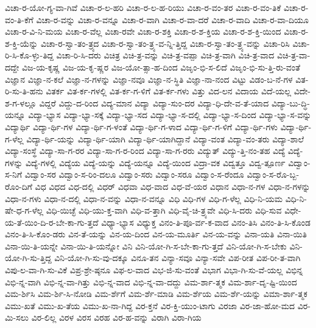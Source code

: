{ವಿಚಾ-ರ-ಯೋ-ಗ್ಯ-ವಾ-ಗಿವೆ
ವಿಚಾ-ರ-ಲ-ಹರಿ
ವಿಚಾ-ರ-ಲ-ಹ-ರಿಯು
ವಿಚಾ-ರ-ವಂ-ತರ
ವಿಚಾ-ರ-ವಂ-ತಿಕೆ
ವಿಚಾ-ರ-ವಂ-ತಿ-ಕೆಗೆ
ವಿಚಾ-ರ-ವನ್ನು
ವಿಚಾ-ರ-ವನ್ನೂ
ವಿಚಾ-ರ-ವಾಗಿ
ವಿಚಾ-ರ-ವಾ-ದರೆ
ವಿಚಾ-ರ-ವಾದಿ
ವಿಚಾ-ರ-ವಾ-ದಿಯೂ
ವಿಚಾ-ರ-ವಿ-ನಿ-ಮಯ
ವಿಚಾ-ರ-ವೆಲ್ಲ
ವಿಚಾ-ರವೇ
ವಿಚಾ-ರ-ಶಕ್ತಿ
ವಿಚಾ-ರ-ಶ-ಕ್ತಿಯ
ವಿಚಾ-ರ-ಶ-ಕ್ತಿ-ಯಿಂದ
ವಿಚಾ-ರ-ಶ-ಕ್ತಿ-ಯೆನ್ನು
ವಿಚಾ-ರ-ಸ್ವಾ-ತಂ-ತ್ರ್ಯದ
ವಿಚಾ-ರ-ಸ್ವಾ-ತಂ-ತ್ರ್ಯ-ವ-ನ್ನಿ-ತ್ತಿದ್ದ
ವಿಚಾ-ರ-ಸ್ವಾ-ತಂ-ತ್ರ್ಯ-ವನ್ನು
ವಿಚಾ-ರಿಸಿ
ವಿಚಾ-ರಿ-ಸಿ-ಕೊ-ಳ್ಳು-ತಿದ್ದ
ವಿಚಾ-ರಿ-ಸಿ-ದರು
ವಿಚಿತ್ರ
ವಿಚಿ-ತ್ರ-ವನ್ನು
ವಿಚಿ-ತ್ರ-ವಪ್ಪಾ
ವಿಚಿ-ತ್ರ-ವಾಗಿ
ವಿಚಿ-ತ್ರ-ವಾದ
ವಿಚಿ-ತ್ರ-ವಾ-ದದ್ದೇ
ವಿಜ-ಯ-ಕೃಷ್ಣ
ವಿಜ-ಯ-ಕೃ-ಷ್ಣರ
ವಿಜ-ಯೋ-ತ್ಸಾ-ಹ-ದಿಂದ
ವಿಜೃಂ-ಭಿ-ಸ-ಲಿದೆ
ವಿಜೃಂ-ಭಿ-ಸು-ತ್ತಿ-ರು-ವಂತೆ
ವಿಜ್ಞಾನ
ವಿಜ್ಞಾ-ನ-ಕಲೆ
ವಿಜ್ಞಾ-ನ-ಗಳನ್ನು
ವಿಜ್ಞಾ-ನವೂ
ವಿಜ್ಞಾ-ನ-ಸ್ಥಿತಿ
ವಿಜ್ಞಾ-ನಾ-ನಂದ
ವಿಟ್ಟು
ವಿಡಂ-ಬ-ನೆ-ಗಳ
ವಿತ-ರಿ-ಸು-ತಿ-ಹನು
ವಿತರ್ಕ
ವಿತ-ರ್ಕ-ಗಳಲ್ಲಿ
ವಿತ-ರ್ಕ-ಗ-ಳಿಗೆ
ವಿತ-ರ್ಕ-ಗಳು
ವಿತ್ತು
ವಿದ-ಲನ
ವಿದಾಯ
ವಿದೆ-ಯಲ್ಲ
ವಿದೇ-ಶ-ಗ-ಳಲ್ಲೂ
ವಿದ್ದರೆ
ವಿದ್ದು-ದ-ರಿಂದ
ವಿದ್ಯ-ಮಾನ
ವಿದ್ಯಾ
ವಿದ್ಯಾ-ಸುಂ-ದರ
ವಿದ್ಯಾ-ಧಿ-ದೇ-ವ-ತೆ-ಯಾದ
ವಿದ್ಯಾ-ಬು-ದ್ಧಿ-ಯನ್ನೂ
ವಿದ್ಯಾ-ಭ್ಯಾಸ
ವಿದ್ಯಾ-ಭ್ಯಾ-ಸಕ್ಕೆ
ವಿದ್ಯಾ-ಭ್ಯಾ-ಸದ
ವಿದ್ಯಾ-ಭ್ಯಾ-ಸ-ದಲ್ಲಿ
ವಿದ್ಯಾ-ಭ್ಯಾ-ಸ-ದಿಂದ
ವಿದ್ಯಾ-ಭ್ಯಾ-ಸ-ವನ್ನು
ವಿದ್ಯಾರ್ಥಿ
ವಿದ್ಯಾ-ರ್ಥಿ-ಗಳ
ವಿದ್ಯಾ-ರ್ಥಿ-ಗ-ಳಂತೆ
ವಿದ್ಯಾ-ರ್ಥಿ-ಗ-ಳಾದ
ವಿದ್ಯಾ-ರ್ಥಿ-ಗ-ಳಿಗೆ
ವಿದ್ಯಾ-ರ್ಥಿ-ಗಳು
ವಿದ್ಯಾ-ರ್ಥಿ-ಗ-ಳೆಲ್ಲ
ವಿದ್ಯಾ-ರ್ಥಿ-ಯನ್ನು
ವಿದ್ಯಾ-ರ್ಥಿ-ಯಾಗಿ
ವಿದ್ಯಾ-ರ್ಥಿ-ಯಾಗಿದ್ದಾನೆ
ವಿದ್ಯಾ-ವಂತ
ವಿದ್ಯಾ-ವಂ-ತರು
ವಿದ್ಯಾ-ಶಾಲೆ
ವಿದ್ಯಾ-ಸಂಸ್ಥೆ
ವಿದ್ಯಾ-ಸಾ-ಗ-ರರ
ವಿದ್ಯಾ-ಸಾ-ಗ-ರ-ರಿಂದ
ವಿದ್ಯಾ-ಸಾ-ಗ-ರರು
ವಿದ್ಯುತ್
ವಿದ್ಯು-ತ್ತಿ-ನಂ-ತಹ
ವಿದ್ಯೆ
ವಿದ್ಯೆ-ಗಳನ್ನು
ವಿದ್ಯೆ-ಗಳಲ್ಲಿ
ವಿದ್ಯೆಯ
ವಿದ್ಯೆ-ಯನ್ನು
ವಿದ್ಯೆ-ಯನ್ನೂ
ವಿದ್ಯೆ-ಯಿಂದ
ವಿದ್ರಾ-ವಕ
ವಿದ್ವತ್ತೂ
ವಿದ್ವ-ತ್ಪೂರ್ಣ
ವಿದ್ವಾಂ-ಸ-ನಿಗೆ
ವಿದ್ವಾಂ-ಸರ
ವಿದ್ವಾಂ-ಸ-ರಿಂ-ದಲೂ
ವಿದ್ವಾಂ-ಸರು
ವಿದ್ವಾಂ-ಸರೂ
ವಿದ್ವಾಂ-ಸ-ರೆಂದೂ
ವಿದ್ವಾಂ-ಸ-ರೊ-ಬ್ಬ-ರೊಂ-ದಿಗೆ
ವಿಧ
ವಿಧದ
ವಿಧ-ದಲ್ಲಿ
ವಿಧರ್
ವಿಧವಾ
ವಿಧ-ವಾದ
ವಿಧ-ವೆ-ಯರ
ವಿಧಾನ
ವಿಧಾ-ನ-ಗಳ
ವಿಧಾ-ನ-ಗಳನ್ನು
ವಿಧಾ-ನ-ಗಳು
ವಿಧಾ-ನ-ದಲ್ಲಿ
ವಿಧಾ-ನ-ವನ್ನು
ವಿಧಾ-ನ-ವನ್ನೂ
ವಿಧಿ
ವಿಧಿ-ಗಳ
ವಿಧಿ-ಗ-ಳೆಲ್ಲ
ವಿಧಿ-ನಿ-ಯಮ
ವಿಧಿ-ನಿ-ಷೇ-ಧ-ಗ-ಳೆಲ್ಲ
ವಿಧಿ-ಯಿಚ್ಛೆ
ವಿಧಿ-ಯು-ಕ್ತ-ವಾಗಿ
ವಿಧಿ-ವ-ತ್ತಾಗಿ
ವಿಧಿ-ವೈ-ಚಿ-ತ್ರ್ಯವೇ
ವಿಧಿ-ಸಿ-ದರು
ವಿಧಿ-ಸುವ
ವಿಧೇ-ಯ-ತೆ-ಯಿಂ-ದಿ-ರ-ಬೇ-ಕಾ-ಗು-ತ್ತದೆ
ವಿಧ್ಯಾ-ಭ್ಯಾಸ
ವಿಧ್ಯುಕ್ತ
ವಿನಂ-ತಿ-ಪೂ-ರ್ವ-ಕ-ವಾದ
ವಿನಂ-ತಿಸಿ
ವಿನಂ-ತಿ-ಸಿ-ಕೊಂಡ
ವಿನಂ-ತಿ-ಸಿ-ಕೊಂ-ಡರು
ವಿನ-ತೆ-ಯನ್ನು
ವಿನ-ಯ-ದಿಂದ
ವಿನ-ಯ-ಮೂರ್ತಿ
ವಿನ-ಯ-ವನ್ನು
ವಿನಾ-ಯತಿ
ವಿನಾ-ಯಿತಿ
ವಿನಾ-ಯಿ-ತಿ-ಯನ್ನೇ
ವಿನಾ-ಯಿ-ತಿ-ಯನ್ನೋ
ವಿನಿ
ವಿನಿ-ಯೋ-ಗಿ-ಸ-ಬೇ-ಕಾ-ಗು-ತ್ತದೆ
ವಿನಿ-ಯೋ-ಗಿ-ಸ-ಬೇಕು
ವಿನಿ-ಯೋ-ಗಿ-ಸು-ತ್ತಿದ್ದ
ವಿನಿ-ಯೋ-ಗಿ-ಸು-ವು-ದಕ್ಕೂ
ವಿನೂ-ತನ
ವಿನ್ಯಾ-ಸವೂ
ವಿನ್ಯಾ-ಸವೇ
ವಿಪ-ರೀತ
ವಿಪ-ರೀ-ತ-ವಾಗಿ
ವಿಪು-ಲ-ವಾ-ಗಿ-ಸು-ವಿಕೆ
ವಿಪ್ರ-ಶ್ರೇ-ಷ್ಠನೂ
ವಿಫ-ಲ-ವಾದ
ವಿಭ-ಜಿ-ಸು-ವಂತೆ
ವಿಭಾಗ
ವಿಭಾ-ಗಿ-ಸು-ವೆ-ಯಲ್ಲ
ವಿಭಿನ್ನ
ವಿಭಿ-ನ್ನ-ವಾಗಿ
ವಿಭಿ-ನ್ನ-ವಾ-ಗಿತ್ತು
ವಿಭಿ-ನ್ನ-ವಾದ
ವಿಭಿ-ನ್ನ-ವಾ-ದದ್ದು
ವಿಮ-ರ್ಶಾ-ತ್ಮಕ
ವಿಮ-ರ್ಶಾ-ದೃ-ಷ್ಟಿ-ಯಿಂದ
ವಿಮ-ರ್ಶಿಸಿ
ವಿಮ-ರ್ಶಿ-ಸಿ-ನೋಡಿ
ವಿಮ-ರ್ಶೆಗೆ
ವಿಮ-ರ್ಶೆ-ಮಾಡಿ
ವಿಮ-ರ್ಶೆಯ
ವಿಮ-ರ್ಶೆ-ಯನ್ನು
ವಿಮಾ-ರ್ಶಾ-ತ್ಮಕ
ವಿಮು-ಖತೆ
ವಿಮು-ಖ-ತೆಯ
ವಿಮು-ಖ-ನಾ-ಗಿದ್ದ
ವಿರ-ಕ್ತನೆ
ವಿರ-ಕ್ತಿ-ಯುಂ-ಟಾಗು
ವಿರಜಾ
ವಿರ-ಜಾ-ಹೋ-ಮದ
ವಿರ-ಮಿ-ಸಲು
ವಿರ-ಲಿಲ್ಲ
ವಿರಳ
ವಿರಸ
ವಿರಹ
ವಿರ-ಹ-ವನ್ನು
ವಿರಾಗಿ
ವಿರಾ-ಗಿಯ
}
